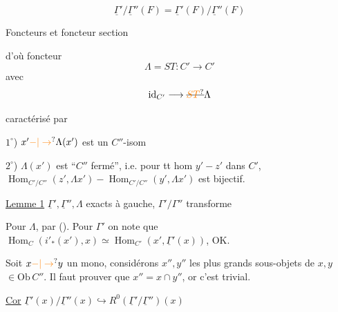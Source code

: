 \[
\underline{\Gamma}'/\underline{\Gamma}''(F)=\underline{\Gamma}'(F)/\underline{\Gamma}''(F)
\]

Foncteurs
et foncteur section


d'où foncteur
\[
\Lambda=ST:C'\longrightarrow C'
\]
avec
\[
\mathrm{id}_{C'}\longrightarrow\deleted{\unsure{ST}}\Lambda
\]

caractérisé par

$1^\circ$) $x'\unsure{\mathord{-}|\to}\Lambda(x')$ est un $C''$-isom

$2^\circ$) $\Lambda(x')$ est ``$C''$ fermé'', i.e. pour tt hom $y'-z'$ dans $C'$, $\operatorname{Hom}_{C'/C''}(z',\Lambda x')-\operatorname{Hom}_{C'/C''}(y',\Lambda x')$ est bijectif.

\uline{Lemme 1} $\underline{\Gamma}',\underline{\Gamma}'',\Lambda$ exacts à gauche, $\Gamma'/\Gamma''$ transforme



Pour $\Lambda$, par  (). Pour $\Gamma'$ on note que  $\operatorname{Hom}_C(i'_*(x'),x)\simeq\operatorname{Hom}_{C'}(x',\underline{\Gamma}'(x))$, OK.

Soit $x\unsure{\mathord{-}|\to}y$ un mono, considérons $x'',y''$ les plus grands sous-objets de $x,y$ $\in\mathrm{Ob}\,C''$. Il faut prouver que
$x''=x\cap y''$, or c'est trivial.

\uline{Cor} $\underline{\Gamma}'(x)/\underline{\Gamma}''(x)\hookrightarrow R^0(\underline{\Gamma}'/\underline{\Gamma}'')(x)$

